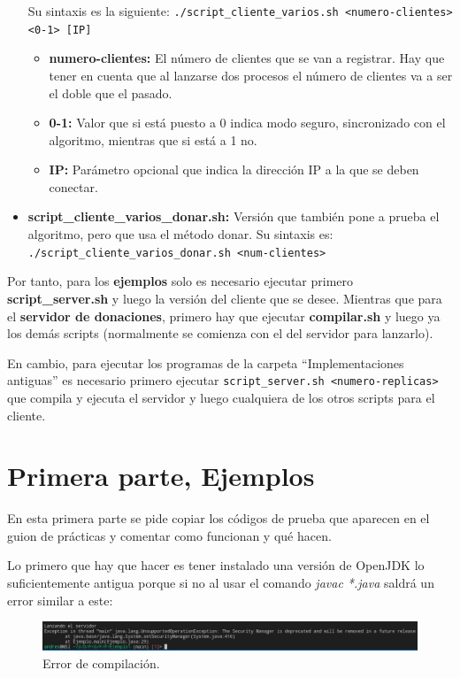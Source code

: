 \documentclass{article}
\begin{document}
\begin{itemize}
    Su sintaxis es la siguiente: \verb|./script_cliente_varios.sh <numero-clientes> <0-1> [IP]|
    
    \begin{itemize}
        \item \textbf{numero-clientes: }El número de clientes que se van a registrar. Hay que tener en cuenta que al lanzarse dos procesos el número de clientes va a ser el doble que el pasado.
        \item \textbf{0-1: }Valor que si está puesto a 0 indica modo seguro, sincronizado con el algoritmo, mientras que si está a 1 no.
        \item \textbf{IP: }Parámetro opcional que indica la dirección IP a la que se deben conectar.
    \end{itemize}

    \item \textbf{script\_cliente\_varios\_donar.sh: }Versión que también pone a prueba el algoritmo, pero que usa el método donar. Su sintaxis es: \verb|./script_cliente_varios_donar.sh <num-clientes>|
\end{itemize}

Por tanto, para los \textbf{ejemplos} solo es necesario ejecutar primero \textbf{script\_server.sh} y luego la versión del cliente que se desee. Mientras que para el \textbf{servidor de donaciones}, primero hay que ejecutar \textbf{compilar.sh} y luego ya los demás scripts (normalmente se comienza con el del servidor para lanzarlo).

\bigskip

En cambio, para ejecutar los programas de la carpeta ``Implementaciones antiguas'' es necesario primero ejecutar \verb|script_server.sh <numero-replicas>| que compila y ejecuta el servidor y luego cualquiera de los otros scripts para el cliente.

\section{Primera parte, Ejemplos}
En esta primera parte se pide copiar los códigos de prueba que aparecen en el guion de prácticas y comentar como funcionan y qué hacen.

\bigskip

Lo primero que hay que hacer es tener instalado una versión de OpenJDK lo suficientemente antigua porque si no al usar el comando \textit{javac *.java} saldrá un error similar a este:

\begin{figure}[H]
    \centering
    \includegraphics[width=\textwidth]{imagenes/fallo compilacion.png}
    \caption{Error de compilación.}
\end{figure}
\end{document}
